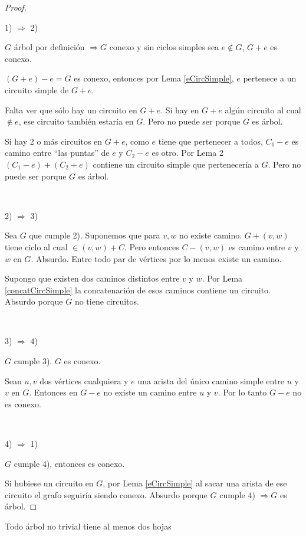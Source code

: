 \begin{proof}
~

1) $\Longrightarrow$ 2)

$G$ árbol por definición $\Longrightarrow G$ conexo y sin ciclos simples sea $e \notin G$, $G + e$ es conexo.

$(G + e) - e = G$ es conexo, entonces por Lema \ref{eCircSimple}, $e$ pertenece a un circuito simple de $G + e$.

Falta ver que sólo hay un circuito en $G + e$. Si hay en $G + e$ algún circuito al cual $\notin e$, ese circuito también estaría en $G$. Pero no puede ser porque $G$ es árbol.

Si hay 2 o más circuitos en $G + e$, como $e$ tiene que pertenecer a todos, $C_1 - e$ es camino entre ``las puntas'' de $e$ y $C_2 - e$ es otro. Por Lema 2 $(C_1 - e) + (C_2 + e)$ contiene un circuito simple que pertenecería a $G$. Pero no puede ser porque $G$ es árbol. 

~

2) $\Longrightarrow$ 3)

Sea $G$ que cumple 2). Suponemos que para $v, w$ no existe camino. $G + (v, w)$ tiene ciclo al cual $\in (v, w) + C$. Pero entonces $C - (v, w)$ es camino entre $v$ y $w$ en $G$. Absurdo. Entre todo par de vértices por lo menos existe un camino.

Supongo que existen dos caminos distintos entre $v$ y $w$. Por Lema \ref{concatCircSimple} la concatenación de esos caminos contiene un circuito. Absurdo porque $G$ no tiene circuitos.

~

3) $\Longrightarrow$ 4)

$G$ cumple 3). $G$ es conexo.

Sean $u, v$ dos vértices cualquiera y $e$ una arista del único camino simple entre $u$ y $v$ en $G$. Entonces en $G - e$ no existe un camino entre $u$ y $v$. Por lo tanto $G - e$ no es conexo.

~

4) $\Longrightarrow$ 1)

$G$ cumple 4), entonces es conexo.

Si hubiese un circuito en $G$, por Lema \ref{eCircSimple} al sacar una arista de ese circuito el grafo seguiría siendo conexo. Absurdo porque $G$ cumple 4) $\Longrightarrow G$ es árbol.
\end{proof}
\begin{lema}[Hojas]
\label{hojas}
    Todo árbol no trivial tiene al menos dos hojas
\end{lema}

